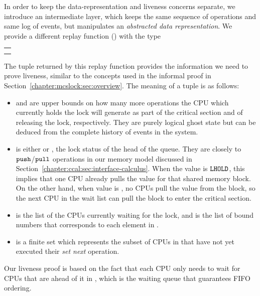 In order to keep the data-representation and liveness concerns separate,
we introduce an intermediate layer, which keeps the same sequence of operations and same log of events, 
but manipulates an \emph{abstracted data representation}.
We provide a different replay function () with the type \newline
\begin{tabular}{P{0.95\textwidth}}
 \\
\end{tabular}\newline
The tuple returned by this replay function provides the information we
need to prove liveness, 
similar to the concepts used in the informal
proof in Section~\ref{chapter:mcslock:sec:overview}. 
The meaning of a tuple  is as follows:
\begin{itemize}
\item  {} and  are upper bounds on how many more operations 
the CPU which currently holds the lock will generate as part of the critical section and of 
releasing the lock, respectively. They are purely logical ghost state but can be deduced from the complete
history of events in the system.

\item {} is either   or , 
the lock status of the head of the queue.
They are closely to ${\mathrm{\texttt{push}}}$/${\mathrm{\texttt{pull}}}$ operations in our memory model discussed in Section~\ref{chapter:ccal:sec:interface-calculus}.
When the  value is ${\texttt{LHOLD}}$, this implies that one CPU already pulls the value for that shared memory block.
On the other hand, when  value is , no CPUs pull the value from the block, so the next CPU in the wait list 
can pull the block to enter the critical section.

\item {} is the list of the CPUs currently waiting for the lock, 
and  is the list of bound numbers that 
corresponds to each element in .

\item {} is a finite set which represents the subset of CPUs in  that have not yet executed their \emph{set next} operation.  
\end{itemize}
Our liveness proof is based on the fact that each CPU only needs to wait for CPUs that are ahead of it in , which is the waiting queue that guarantees FIFO ordering.

